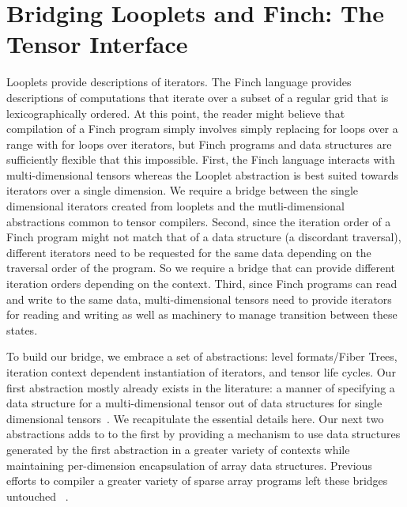 \section{Bridging Looplets and Finch: The Tensor Interface}
Looplets provide descriptions of iterators. 
%
The Finch language provides descriptions of computations that iterate over a subset of a regular grid that is lexicographically ordered.
%
At this point, the reader might believe that compilation of a Finch program simply involves simply replacing for loops over a range with for loops over iterators, but Finch programs and data structures are sufficiently flexible that this impossible.
%
First, the Finch language interacts with multi-dimensional tensors whereas the Looplet abstraction is best suited towards iterators over a single dimension.
%
We require a bridge between the single dimensional iterators created from looplets and the mutli-dimensional abstractions common to tensor compilers.
%
Second, since the iteration order of a Finch program might not match that of a data structure (a discordant traversal), different iterators need to be requested for the same data depending on the traversal order of the program.
%
So we require a bridge that can provide different iteration orders depending on the context.
%
Third, since Finch programs can read and write to the same data, multi-dimensional tensors need to provide iterators for reading and writing as well as machinery to manage transition between these states.

To build our bridge, we embrace a set of abstractions: level formats/Fiber Trees, iteration context dependent instantiation of iterators, and tensor life cycles.
%
Our first abstraction mostly already exists in the literature: a manner of specifying a data structure for a multi-dimensional tensor out of data structures for single dimensional tensors~\cite{sze2017efficient ,chou2022compilation, chou2018format}. 
%
We recapitulate the essential details here.
%
Our next two abstractions adds to to the first by providing a mechanism to use data structures generated by the first abstraction in a greater variety of contexts while maintaining per-dimension encapsulation of array data structures.
%
Previous efforts to compiler a greater variety of sparse array programs left these bridges untouched ~\cite{henry_compilation_2021, won2023unified, senanayake2020sparse}.
%
%

